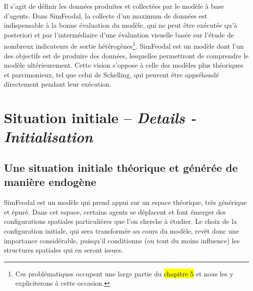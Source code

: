 Il s'agit de définir les données produites et collectées par le modèle à base d'agents.
Dans SimFeodal, la collecte d'un maximum de données est indispensable à la bonne évaluation du modèle, qui ne peut être exécutée qu'à posteriori et par l'intermédiaire d'une \og évaluation visuelle\fg{} basée sur l'étude de nombreux indicateurs de sortie hétérogènes\footnote{
	Ces problématiques occupent une large partie du \hl{chapitre 5} et nous les y expliciterons à cette occasion.
}.
SimFeodal est un modèle dont l'un des objectifs est de produire des données, lesquelles permettront de comprendre le modèle ultérieurement.
Cette vision s'oppose à celle des modèles plus théoriques et parcimonieux, tel que celui de Schelling, qui peuvent être appréhendé directement pendant leur exécution. 

\let\orisectionmark\sectionmark
\renewcommand\sectionmark[1]{}%
\section[Situation initiale -- \textit{Details - Initialisation}]{Situation initiale -- \large{\textit{Details - Initialisation}}\label{sec:initialisation}}
\orisectionmark{Situation initiale}
\let\sectionmark\orisectionmark

\setcounter{savefootnote}{\value{footnote}}

\subsection{Une situation initiale théorique et générée de manière endogène}

SimFeodal est un modèle qui prend appui sur un espace théorique, très générique et épuré.
Dans cet espace, certains agents se déplacent et font émerger des configurations spatiales particulières que l'on cherche à étudier.
Le choix de la configuration initiale, qui sera transformée au cours du modèle, revêt donc une importance considérable, puisqu'il conditionne (ou tout du moins influence) les structures spatiales qui en seront issues.


